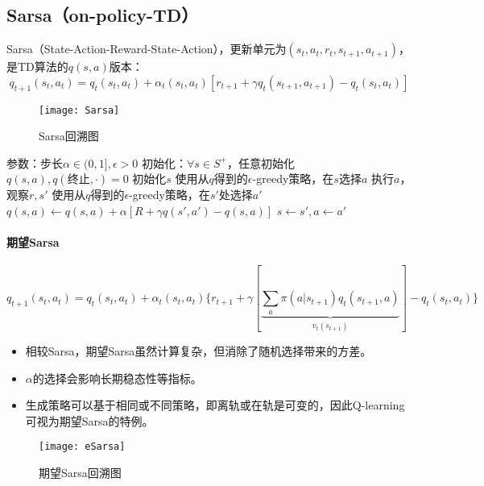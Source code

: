 \documentclass[
12pt, %
a4paper, 
oneside, %
headinclude,footinclude, %
]{scrartcl}
\begin{document}
\subsection[Sarsa]{Sarsa（on-policy-TD）}
Sarsa（State-Action-Reward-State-Action），更新单元为$ (s_t, a_t, r_t, s_{t + 1}, a_{t + 1}) $，是TD算法的$ q(s, a) $版本：
$$ q_{t + 1}(s_t, a_t) = q_t(s_t, a_t) + \alpha_t(s_t, a_t)[r_{t + 1} + \gamma q_t(s_{t + 1}, a_{t + 1}) - q_t(s_t, a_t)] $$

\begin{figure}[H]
\centering
\texttt{[image: Sarsa]}
\caption[Sarsa回溯图]{Sarsa回溯图}
\end{figure}
\begin{myalgorithm}
\State 参数：步长$ \alpha \in (0,1], \epsilon > 0 $
\State 初始化：$ \forall s \in S^+ $，任意初始化$ q(s,a), q(\text{终止}, \cdot) = 0 $
\State 初始化$ s $
\State 使用从$ q $得到的$ \epsilon $-greedy策略，在$ s $选择$ a $
\State 执行$ a $，观察$ r, s' $
\State 使用从$ q $得到的$ \epsilon$-greedy策略，在$ s' $处选择$ a' $
\State $ q(s, a) \gets q(s, a) + \alpha [R + \gamma q(s', a') - q(s, a)] $
\State $ s \gets s', a \gets a' $
\EndWhile
\EndFor
\end{myalgorithm}
\paragraph{期望Sarsa}
$$ q_{t + 1}(s_t, a_t) = q_t(s_t, a_t) + \alpha_t(s_t, a_t)\{r_{t + 1} + \gamma[\underbrace{\sum_a \pi(a|s_{t + 1}) q_t(s_{t + 1}, a)}_{v_t(s_{t + 1})}] - q_t(s_t, a_t)\} $$

\begin{minipage}{0.6\textwidth}
\begin{itemize}
\item 相较Sarsa，期望Sarsa虽然计算复杂，但消除了随机选择带来的方差。
\item $ \alpha $的选择会影响长期稳态性等指标。
\item 生成策略可以基于相同或不同策略，即离轨或在轨是可变的，因此Q-learning可视为期望Sarsa的特例。
\end{itemize}
\end{minipage}
\hfill
\begin{minipage}{0.35\textwidth}
\begin{figure}[H]
\centering
\texttt{[image: eSarsa]}
\caption[期望Sarsa回溯图]{期望Sarsa回溯图}
\end{figure}
\end{minipage}
\end{document}
